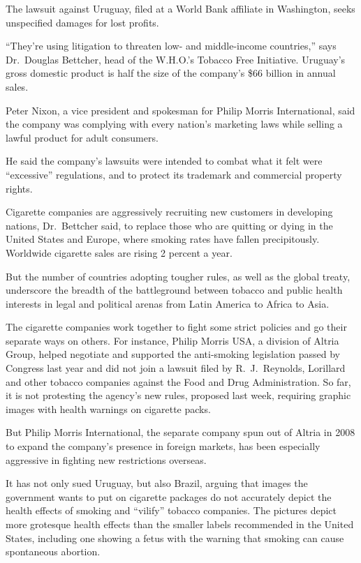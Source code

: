 ﻿\documentclass[12pt]{article}
\begin{document}
The lawsuit against Uruguay, filed at a World Bank affiliate in Washington, seeks unspecified
damages for lost profits.

``They're using litigation to threaten low- and middle-income countries,'' says Dr.~Douglas
Bettcher, head of the W.H.O.'s Tobacco Free Initiative. Uruguay's gross domestic product is half the
size of the company's \$66 billion in annual sales.

Peter Nixon, a vice president and spokesman for Philip Morris International, said the company was
complying with every nation's marketing laws while selling a lawful product for adult consumers.

He said the company's lawsuits were intended to combat what it felt were ``excessive'' regulations,
and to protect its trademark and commercial property rights.

Cigarette companies are aggressively recruiting new customers in developing nations, Dr.~Bettcher
said, to replace those who are quitting or dying in the United States and Europe, where smoking
rates have fallen precipitously. Worldwide cigarette sales are rising 2 percent a year.

But the number of countries adopting tougher rules, as well as the global treaty, underscore the
breadth of the battleground between tobacco and public health interests in legal and political
arenas from Latin America to Africa to Asia.

The cigarette companies work together to fight some strict policies and go their separate ways on
others. For instance, Philip Morris USA, a division of Altria Group, helped negotiate and supported
the anti-smoking legislation passed by Congress last year and did not join a lawsuit filed by
R.~J.~Reynolds, Lorillard and other tobacco companies against the Food and Drug Administration. So
far, it is not protesting the agency's new rules, proposed last week, requiring graphic images with
health warnings on cigarette packs.

But Philip Morris International, the separate company spun out of Altria in 2008 to expand the
company's presence in foreign markets, has been especially aggressive in fighting new restrictions
overseas.

It has not only sued Uruguay, but also Brazil, arguing that images the government wants to put on
cigarette packages do not accurately depict the health effects of smoking and ``vilify'' tobacco
companies. The pictures depict more grotesque health effects than the smaller labels recommended in
the United States, including one showing a fetus with the warning that smoking can cause spontaneous
abortion.
\end{document}
